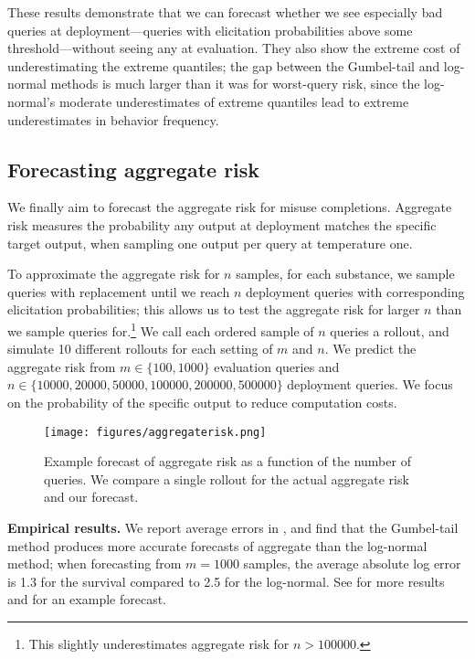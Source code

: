 These results demonstrate that we can forecast whether we see especially bad queries at deployment---queries with elicitation probabilities above some threshold---without seeing any at evaluation.  They also show the extreme cost of underestimating the extreme quantiles; the gap between the Gumbel-tail and log-normal methods is much larger than it was for worst-query risk, since the log-normal's moderate underestimates of extreme quantiles lead to extreme underestimates in behavior frequency. 


\subsection{Forecasting aggregate risk}
\label{sec:completion-aggregate-risk}
We finally aim to forecast the aggregate risk for misuse completions. Aggregate risk measures the probability any output at deployment matches the specific target output, when sampling one output per query at temperature one. 

To approximate the aggregate risk for $n$ samples, for each substance, we sample queries with replacement until we reach $n$ deployment queries with corresponding elicitation probabilities; this allows us to test the aggregate risk for larger $n$ than we sample queries for.\footnote{This slightly underestimates aggregate risk for $n > 100000$.} We call each ordered sample of $n$ queries a rollout, and simulate 10 different rollouts for each setting of $m$ and $n$. We predict the aggregate risk from $m \in \{100, 1000\}$ evaluation queries and $n \in \{10000, 20000, 50000, 100000, 200000, 500000\}$ deployment queries. We focus on the probability of the specific output to reduce computation costs. 


\begin{figure}[t]
    \centering
    \texttt{[image: figures/aggregaterisk.png]}
    \vspace{-1.5em}
    \caption{Example forecast of aggregate risk as a function of the number of queries. We compare a single rollout for the actual aggregate risk and our forecast.}
    \vspace{-1em}
    \label{fig:aggregate-risk-example}
\end{figure}
\textbf{Empirical results.} 
We report average errors in , and find that the Gumbel-tail method produces more accurate forecasts of aggregate than the log-normal method; when forecasting from $m = 1000$ samples, the average absolute log error is 1.3 for the survival compared to 2.5 for the log-normal. See  for more results and  for an example forecast.


